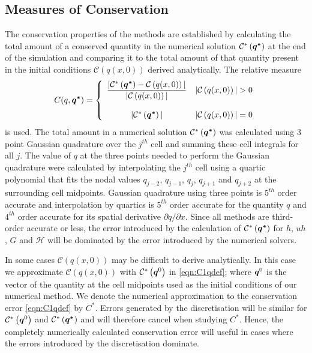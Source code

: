 \subsection{Measures of Conservation}
The conservation properties of the methods are established by calculating the total amount of a conserved quantity in the numerical solution $\mathcal{C}^*\left({\boldsymbol{q^*}}\right)$ at the end of the simulation and comparing it to the total amount of that quantity present in the initial conditions $\mathcal{C}\left({q(x,0)} \right)$ derived analytically. The relative measure
\begin{equation}
C(q,\boldsymbol{q^*}) =  \left\lbrace \begin{array}{c r} 
\dfrac{|\mathcal{C}^*\left({\boldsymbol{q^*}}\right) - \mathcal{C}\left({q(x,0)} \right)| }{|\mathcal{C}\left({q(x,0)} \right)|} & |\mathcal{C}\left({q(x,0)} \right)| > 0 \\ \\
|\mathcal{C}^*\left({\boldsymbol{q^*}}\right)| & |\mathcal{C}\left({q(x,0)} \right)| = 0  \end{array}\right. 
\label{eqn:C1qdef} 
\end{equation}
is used. The total amount in a numerical solution $\mathcal{C}^*\left({\boldsymbol{q^*}}\right)$ was calculated using 3 point Gaussian quadrature over the $j^{th}$ cell and summing these cell integrals for all $j$. The value of $q$ at the three points needed to perform the Gaussian quadrature were calculated by interpolating the $j^{th}$ cell using a quartic polynomial that fits the nodal values $q_{j-2}$, $q_{j-1}$, $q_{j}$, $q_{j+1}$ and $q_{j+2}$ at the surrounding cell midpoints. Gaussian quadrature using three points is $5^{th}$ order accurate and interpolation by quartics is $5^{th}$ order accurate for the quantity $q$ and $4^{th}$ order accurate for its spatial derivative $\partial q / \partial x$. Since all methods are third-order accurate or less, the error introduced by the calculation of $\mathcal{C}^*\left({\boldsymbol{q^*}}\right)$ for $h$, $uh$, $G$ and $\mathcal{H}$ will be dominated by the error introduced by the numerical solvers.

In some cases $\mathcal{C}\left({q(x,0)} \right)$ may be difficult to derive analytically. In this case we approximate $\mathcal{C}\left({q(x,0)} \right)$ with $\mathcal{C}^*\left(\boldsymbol{q}^0\right)$ in \eqref{eqn:C1qdef}; where $\boldsymbol{q}^0$ is the vector of the quantity at the cell midpoints used as the initial conditions of our numerical method. We denote the numerical approximation to the conservation error \eqref{eqn:C1qdef} by $C^*$. Errors generated by the discretisation will be similar for $\mathcal{C}^*\left(\boldsymbol{q}^0\right)$ and $\mathcal{C}^*\left(\boldsymbol{q^*}\right)$ and will therefore cancel when studying $C^*$. Hence, the completely numerically calculated conservation error will useful in cases where the errors introduced by the discretisation dominate.


